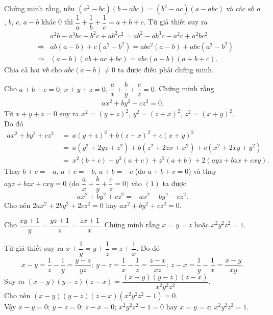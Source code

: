 \begin{bt}%
 Chứng minh rằng, nếu $(a^2-bc)(b-abc)=(b^2-ac)(a-abc)$ và các số $a$, $b$, $c$, $a-b$ khác $0$ thì $\dfrac{1}{a}+\dfrac{1}{b}+\dfrac{1}{c}=a+b+c$.
 \loigiai
  {
  Từ giả thiết suy ra
  \allowdisplaybreaks
  \begin{eqnarray*}
   & & a^2b-a^3bc-b^2c+ab^2c^2 = ab^2-ab^3c-a^2c+a^2bc^2\\
   &\Rightarrow & ab(a-b) + c(a^2-b^2) = abc^2(a-b)+abc(a^2-b^2)\\
   &\Rightarrow & (a-b)(ab+ac+bc) = abc(a-b)(a+b+c).
  \end{eqnarray*}
  Chia cả hai vế cho $abc(a-b) \neq 0$ ta được điều phải chứng minh.
  }
\end{bt}

\begin{bt}%
 Cho $a+b+c=0$, $x+y+z=0$, $\dfrac{a}{x}+\dfrac{b}{y}+\dfrac{c}{z}=0$. Chứng minh rằng
 \begin{eqnarray*}
  ax^2+by^2+cz^2=0.
 \end{eqnarray*}
 \loigiai
  {
  Từ $x+y+z=0$ suy ra $x^2=(y+z)^2$, $y^2=(z+x)^2$, $z^2=(x+y)^2$.\\
  Do đó
  \allowdisplaybreaks
  \begin{align*}
   ax^2+by^2+cz^2 &\ =\ a(y+z)^2 + b(z+x)^2 + c(x+y)^2\\
   &\ =\ a(y^2+2yz+z^2) + b(z^2+2zx+x^2) + c(x^2+2xy+y^2)\\
   &\ =\ x^2(b+c) + y^2(a+c) + z^2(a+b) +2(ayz+bzx+cxy). \tag{1}
  \end{align*}
  Thay $b+c=-a$, $a+c=-b$, $a+b=-c$ (do $a+b+c=0$) và thay $ayz+bzx+cxy=0$ $\Big($do $\dfrac{a}{x}+\dfrac{b}{y}+\dfrac{c}{z}=0\Big)$ vào $(1)$ ta được
  \[ax^2+by^2+cz^2=-ax^2-by^2-cz^2. \]
  Cho nên $2ax^2+2by^2+2cz^2=0$ hay $ax^2+by^2+cz^2=0$.
  }
\end{bt}

\begin{bt}%
 Cho $\dfrac{xy+1}{y}=\dfrac{yz+1}{z}=\dfrac{zx+1}{x}$. Chứng minh rằng $x=y=z$ hoặc $x^2y^2z^2=1$.
 \loigiai
  {
  Từ giả thiết suy ra $x+\dfrac{1}{y}=y+\dfrac{1}{z}=z+\dfrac{1}{x}$. Do đó
  \[x-y=\dfrac{1}{z}-\dfrac{1}{y}=\dfrac{y-z}{yz};\ y-z=\dfrac{1}{x}-\dfrac{1}{z}=\dfrac{z-x}{xz};\ z-x=\dfrac{1}{y}-\dfrac{1}{x}=\dfrac{x-y}{xy}. \]
  Suy ra $(x-y)(y-z)(z-x)=\dfrac{(x-y)(y-z)(z-x)}{x^2y^2z^2}$.\\
  Cho nên $(x-y)(y-z)(z-x)(x^2y^2z^2-1)=0$.\\
  Vậy $x-y=0$; $y-z=0$; $z-x=0$; $x^2y^2z^2-1=0$ hay $x=y=z$; $x^2y^2z^2=1$.
  
  }
\end{bt}

